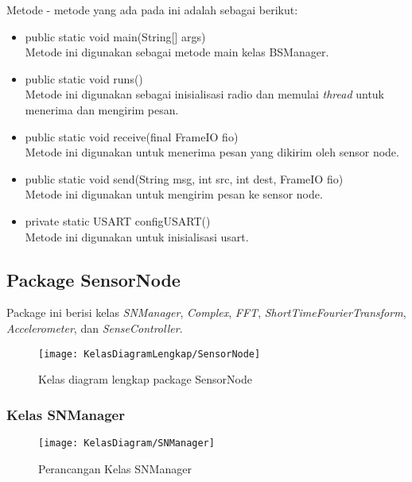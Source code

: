 Metode - metode yang ada pada ini adalah sebagai berikut:
\begin{itemize}
	\item public static void main(String[] args) \\
		Metode ini digunakan sebagai metode main kelas BSManager.
	\item public static void runs()\\
		Metode ini digunakan sebagai inisialisasi radio dan memulai {\it thread} untuk menerima dan mengirim pesan.
	\item public static void receive(final FrameIO fio) \\
		Metode ini digunakan untuk menerima pesan yang dikirim oleh sensor node.
	\item public static void send(String msg, int src, int dest, FrameIO fio) \\
		Metode ini digunakan untuk mengirim pesan ke sensor node.
	\item private static USART configUSART() \\
		Metode ini digunakan untuk inisialisasi usart.
\end{itemize}

\subsection{Package SensorNode}
Package ini berisi kelas {\it SNManager}, {\it Complex}, {\it FFT}, {\it ShortTimeFourierTransform}, {\it Accelerometer}, dan {\it SenseController}.

\begin{figure}[H]
	\centering
	\texttt{[image: KelasDiagramLengkap/SensorNode]}  
	\caption[Kelas diagram lengkap package SensorNode]{Kelas diagram lengkap package SensorNode} 
	\label{fig:KelasDiagramLengkapSensorNode} 
\end{figure}  

\subsubsection{Kelas SNManager}
\begin{figure}[H]
	\centering
	\texttt{[image: KelasDiagram/SNManager]}  
	\caption[Perancangan Kelas SNManager]{Perancangan Kelas SNManager} 
	\label{fig:KelasSNManager} 
\end{figure}

